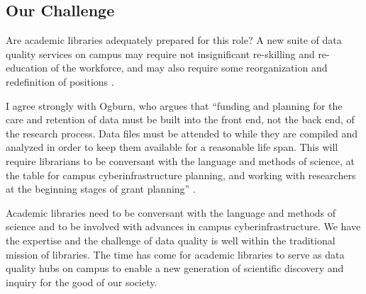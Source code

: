 \documentclass[man,12pt,biblatex]{apa6}
\begin{document}
%

\subsection{Our Challenge}

Are academic libraries adequately prepared for this role?  A new suite
of data quality services on campus may require not insignificant
re-skilling and re-education of the workforce, and may also require
some reorganization and redefinition of positions \parencite{jisc:deluge}.

%

%

I agree strongly with Ogburn, who argues that ``funding and planning
for the care and retention of data must be built into the front end,
not the back end, of the research process. Data files must be attended
to while they are compiled and analyzed in order to keep them
available for a reasonable life span. This will require librarians to
be conversant with the language and methods of science, at the table
for campus cyberinfrastructure planning, and working with researchers
at the beginning stages of grant planning''
\parencite{ogburn:imperative}.

Academic libraries need to be conversant with the language and methods
of science and to be involved with advances in campus
cyberinfrastructure. We have the expertise and the challenge of data
quality is well within the traditional mission of libraries. The time
has come for academic libraries to serve as data quality hubs on
campus to enable a new generation of scientific discovery and inquiry
for the good of our society.

\printbibliography
\end{document}
